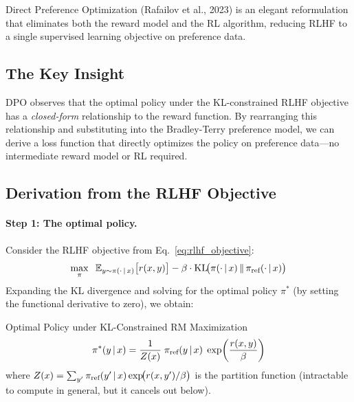 Direct Preference Optimization (Rafailov et al., 2023) is an elegant
reformulation that eliminates both the reward model and the RL algorithm,
reducing RLHF to a single supervised learning objective on preference data.

\subsection{The Key Insight}

DPO observes that the optimal policy under the KL-constrained RLHF
objective has a \emph{closed-form} relationship to the reward function.
By rearranging this relationship and substituting into the Bradley-Terry
preference model, we can derive a loss function that directly optimizes
the policy on preference data---no intermediate reward model or RL required.

\subsection{Derivation from the RLHF Objective}

\paragraph{Step 1: The optimal policy.}
Consider the RLHF objective from Eq.~\eqref{eq:rlhf_objective}:
\[
\max_{\pi} \;\;
\operatorname{\mathbb{E}}_{y \sim \pi(\cdot \,|\, x)}
\bigl[r(x, y)\bigr]
- \beta \cdot \operatorname{KL}\!\bigl(\pi(\cdot \,|\, x) \,\|\, \pi_{\text{ref}}(\cdot \,|\, x)\bigr)
\]
Expanding the KL divergence and solving for the optimal policy $\pi^*$
(by setting the functional derivative to zero), we obtain:

\begin{mathresult}{Optimal Policy under KL-Constrained RM Maximization}
\begin{equation}
\pi^*(y \,|\, x) = \frac{1}{Z(x)} \; \pi_{\text{ref}}(y \,|\, x) \;\exp\!\left(\frac{r(x, y)}{\beta}\right)
\label{eq:optimal_policy}
\end{equation}
where $Z(x) = \sum_{y'} \pi_{\text{ref}}(y' \,|\, x) \exp\!\bigl(r(x, y')/\beta\bigr)$ is the partition function (intractable to compute in general, but it cancels out below).
\end{mathresult}

